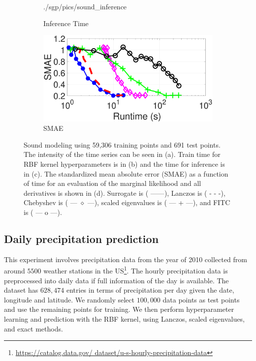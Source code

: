 \begin{figure}[ht]
\begin{center}
\begin{subfigure}{0.47\textwidth}
      {./sgp/pics/sound_inference}
      \caption{Inference Time}\label{fig:sound_inference}
    \end{subfigure}
    \begin{subfigure}{0.47\textwidth}
      \includegraphics[width=\textwidth,trim=0.4cm 0cm 2.5cm 0.5cm,clip]
      {./sgp/pics/sound_smae}
      \caption{SMAE}\label{fig:sound_smae}
    \end{subfigure}
  \end{center}
  \caption{Sound modeling using 59,306 training points and 691 test points. The
  intensity of the time series can be seen in (a). Train time for RBF kernel
  hyperparameters is in (b) and the time for inference is in (c). The
  standardized mean absolute error (SMAE) as a function of time for an
  evaluation of the marginal likelihood and all derivatives is shown in (d).
  Surrogate is ({\color{blue} ------}), Lanczos is ({\color{red} - - -}),
  Chebyshev is {(\color{magenta} --- $\diamond$ ---}), scaled eigenvalues is ({
  \color{green} --- + ---}), and FITC is ({\color{black} --- o ---}).}
  \label{fig:sound_modeling}
\end{figure}

\subsection{Daily precipitation prediction}
This experiment involves precipitation data from the year of 2010 collected from
around $5500$ weather stations in the US\footnote{\url{https://catalog.data.gov/
dataset/u-s-hourly-precipitation-data}}. The hourly precipitation data is
preprocessed into daily data if full information of the day is available. The
dataset has $628,474$ entries in terms of precipitation per day given the date,
longitude and latitude. We randomly select $100,000$ data points as test points
and use the remaining points for training. We then perform hyperparameter
learning and prediction with the RBF kernel, using Lanczos, scaled eigenvalues,
and exact methods.

